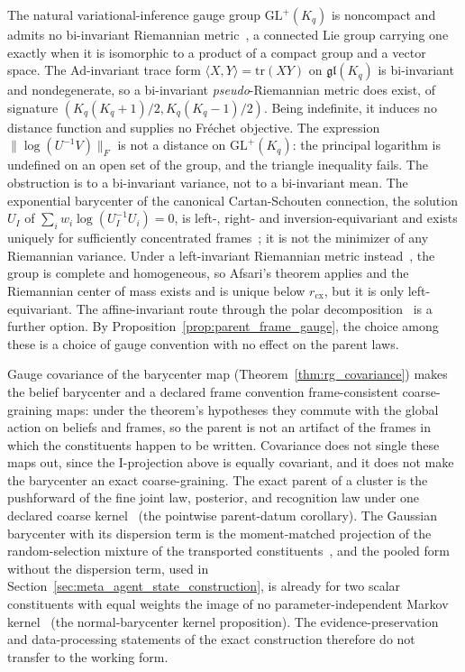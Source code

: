 The natural variational-inference gauge group $\mathrm{GL}^+(K_q)$ is noncompact and admits no bi-invariant Riemannian metric~\cite[Lemma 7.5]{Milnor1976}, a connected Lie group carrying one exactly when it is isomorphic to a product of a compact group and a vector space. The Ad-invariant trace form $\langle X, Y \rangle = \mathrm{tr}(XY)$ on $\mathfrak{gl}(K_q)$ is bi-invariant and nondegenerate, so a bi-invariant \emph{pseudo}-Riemannian metric does exist, of signature $(K_q(K_q+1)/2, K_q(K_q-1)/2)$. Being indefinite, it induces no distance function and supplies no Fr\'echet objective. The expression $\|\log(U^{-1}V)\|_F$ is not a distance on $\mathrm{GL}^+(K_q)$: the principal logarithm is undefined on an open set of the group, and the triangle inequality fails. The obstruction is to a bi-invariant variance, not to a bi-invariant mean. The exponential barycenter of the canonical Cartan-Schouten connection, the solution $U_I$ of $\sum_i w_i \log(U_I^{-1}U_i) = 0$, is left-, right- and inversion-equivariant and exists uniquely for sufficiently concentrated frames~\cite[Thms.~11--12]{PennecArsigny2013}; it is not the minimizer of any Riemannian variance. Under a left-invariant Riemannian metric instead~\cite{Milnor1976, Andruchow2014}, the group is complete and homogeneous, so Afsari's theorem applies and the Riemannian center of mass exists and is unique below $r_{\mathrm{cx}}$, but it is only left-equivariant. The affine-invariant route through the polar decomposition~\cite{PennecFillardAyache2006} is a further option. By Proposition~\ref{prop:parent_frame_gauge}, the choice among these is a choice of gauge convention with no effect on the parent laws.

Gauge covariance of the barycenter map (Theorem~\ref{thm:rg_covariance}) makes the belief barycenter and a declared frame convention frame-consistent coarse-graining maps: under the theorem's hypotheses they commute with the global action on beliefs and frames, so the parent is not an artifact of the frames in which the constituents happen to be written. Covariance does not single these maps out, since the I-projection above is equally covariant, and it does not make the barycenter an exact coarse-graining. The exact parent of a cluster is the pushforward of the fine joint law, posterior, and recognition law under one declared coarse kernel~\cite[Ch.~9]{DennisGaugeVFE2026} (the pointwise parent-datum corollary). The Gaussian barycenter with its dispersion term is the moment-matched projection of the random-selection mixture of the transported constituents~\cite[Ch.~G8]{DennisGaugeVFESuppG2026}, and the pooled form without the dispersion term, used in Section~\ref{sec:meta_agent_state_construction}, is already for two scalar constituents with equal weights the image of no parameter-independent Markov kernel~\cite[Ch.~G8]{DennisGaugeVFESuppG2026} (the normal-barycenter kernel proposition). The evidence-preservation and data-processing statements of the exact construction therefore do not transfer to the working form.

